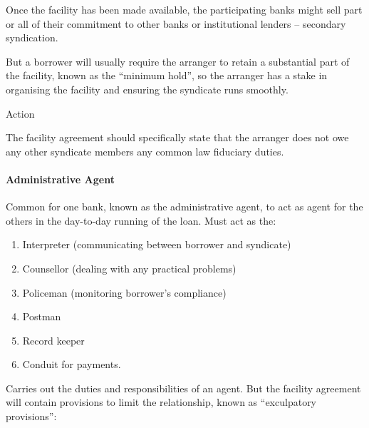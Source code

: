 \documentclass[
]{article}
\providecommand{\tightlist}{%
  \setlength{\itemsep}{0pt}\setlength{\parskip}{0pt}}
\newenvironment{env-44715b9d-4e2d-4299-8f00-b7d1037cd4ad}
{
    \savenotes\tcolorbox[blanker,breakable,left=5pt,borderline west={2pt}{-4pt}{aquamarine}]
}
{
    \endtcolorbox\spewnotes
}
\begin{document}
Once the facility has been made available, the participating banks might
sell part or all of their commitment to other banks or institutional
lenders -- secondary syndication.

But a borrower will usually require the arranger to retain a substantial
part of the facility, known as the ``minimum hold'', so the arranger has
a stake in organising the facility and ensuring the syndicate runs
smoothly.

\begin{env-44715b9d-4e2d-4299-8f00-b7d1037cd4ad}

Action

The facility agreement should specifically state that the arranger does
not owe any other syndicate members any common law fiduciary duties.

\end{env-44715b9d-4e2d-4299-8f00-b7d1037cd4ad}

\hypertarget{administrative-agent}{%
\paragraph{Administrative Agent}\label{administrative-agent}}

Common for one bank, known as the administrative agent, to act as agent
for the others in the day-to-day running of the loan. Must act as the:

\begin{enumerate}
\tightlist
\item
  Interpreter (communicating between borrower and syndicate)
\item
  Counsellor (dealing with any practical problems)
\item
  Policeman (monitoring borrower's compliance)
\item
  Postman
\item
  Record keeper
\item
  Conduit for payments.
\end{enumerate}

Carries out the duties and responsibilities of an agent. But the
facility agreement will contain provisions to limit the relationship,
known as ``exculpatory provisions'':
\end{document}
